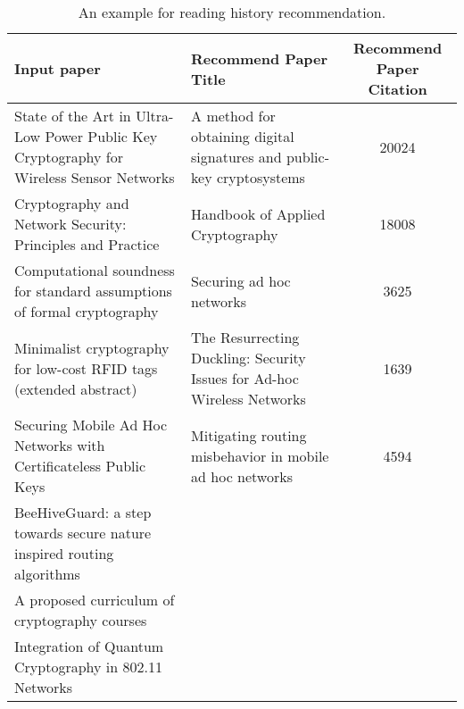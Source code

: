 \begin{table}
	\centering
	\begin{tabular}{p{6cm}p{6cm}c}
		\toprule
		\textbf{Input paper}		& \textbf{Recommend Paper Title} 		& \textbf{Recommend Paper Citation} 	\\ \midrule
		State of the Art in Ultra-Low Power Public Key Cryptography for Wireless Sensor Networks &A method for obtaining digital signatures and public-key cryptosystems	&20024\\
		Cryptography and Network Security: Principles and Practice				&Handbook of Applied Cryptography &18008\\
		Computational soundness for standard assumptions of formal cryptography				&Securing ad hoc networks &3625\\
		Minimalist cryptography for low-cost RFID tags (extended abstract)				&The Resurrecting Duckling: Security Issues for Ad-hoc Wireless Networks &1639\\
		Securing Mobile Ad Hoc Networks with Certificateless Public Keys				&Mitigating routing misbehavior in mobile ad hoc networks&4594\\
		BeeHiveGuard: a step towards secure nature inspired routing algorithms\\
		A proposed curriculum of cryptography courses\\
		Integration of Quantum Cryptography in 802.11 Networks\\
		\bottomrule
	\end{tabular}
	\vspace{3mm}
	\caption{An example for reading history recommendation. }
	\label{res:patternexp}
\end{table}



